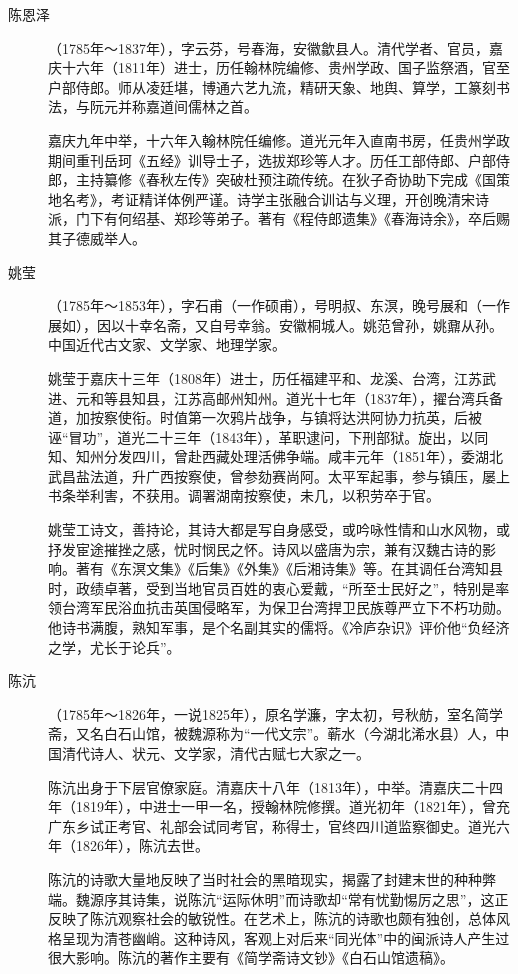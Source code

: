 \begin{description}
  \item[陈恩泽] （1785年～1837年），字云芬，号春海，安徽歙县人。清代学者、官员，嘉庆十六年（1811年）进士，历任翰林院编修、贵州学政、国子监祭酒，官至户部侍郎。师从凌廷堪，博通六艺九流，精研天象、地舆、算学，工篆刻书法，与阮元并称嘉道间儒林之首。\par
        嘉庆九年中举，十六年入翰林院任编修。道光元年入直南书房，任贵州学政期间重刊岳珂《五经》训导士子，选拔郑珍等人才。历任工部侍郎、户部侍郎，主持纂修《春秋左传》突破杜预注疏传统。在狄子奇协助下完成《国策地名考》，考证精详体例严谨。诗学主张融合训诂与义理，开创晚清宋诗派，门下有何绍基、郑珍等弟子。著有《程侍郎遗集》《春海诗余》，卒后赐其子德威举人。
  \item[姚莹] （1785年～1853年），字石甫（一作硕甫），号明叔、东溟，晚号展和（一作展如），因以十幸名斋，又自号幸翁。安徽桐城人。姚范曾孙，姚鼐从孙。中国近代古文家、文学家、地理学家。\par
        姚莹于嘉庆十三年（1808年）进士，历任福建平和、龙溪、台湾，江苏武进、元和等县知县，江苏高邮州知州。道光十七年（1837年），擢台湾兵备道，加按察使衔。时值第一次鸦片战争，与镇将达洪阿协力抗英，后被诬“冒功”，道光二十三年（1843年），革职逮问，下刑部狱。旋出，以同知、知州分发四川，曾赴西藏处理活佛争端。咸丰元年（1851年），委湖北武昌盐法道，升广西按察使，曾参劾赛尚阿。太平军起事，参与镇压，屡上书条举利害，不获用。调署湖南按察使，未几，以积劳卒于官。\par
        姚莹工诗文，善持论，其诗大都是写自身感受，或吟咏性情和山水风物，或抒发宦途摧挫之感，忧时悯民之怀。诗风以盛唐为宗，兼有汉魏古诗的影响。著有《东溟文集》《后集》《外集》《后湘诗集》等。在其调任台湾知县时，政绩卓著，受到当地官员百姓的衷心爱戴，“所至士民好之”，特别是率领台湾军民浴血抗击英国侵略军，为保卫台湾捍卫民族尊严立下不朽功勋。他诗书满腹，熟知军事，是个名副其实的儒将。《冷庐杂识》评价他“负经济之学，尤长于论兵”。
  \item[陈沆] （1785年～1826年，一说1825年），原名学濂，字太初，号秋舫，室名简学斋，又名白石山馆，被魏源称为“一代文宗”。蕲水（今湖北浠水县）人，中国清代诗人、状元、文学家，清代古赋七大家之一。\par
        陈沆出身于下层官僚家庭。清嘉庆十八年（1813年），中举。清嘉庆二十四年（1819年），中进士一甲一名，授翰林院修撰。道光初年（1821年），曾充广东乡试正考官、礼部会试同考官，称得士，官终四川道监察御史。道光六年（1826年），陈沆去世。\par
        陈沆的诗歌大量地反映了当时社会的黑暗现实，揭露了封建末世的种种弊端。魏源序其诗集，说陈沆“运际休明”而诗歌却“常有忧勤惕厉之思”，这正反映了陈沆观察社会的敏锐性。在艺术上，陈沆的诗歌也颇有独创，总体风格呈现为清苍幽峭。这种诗风，客观上对后来“同光体”中的闽派诗人产生过很大影响。陈沆的著作主要有《简学斋诗文钞》《白石山馆遗稿》。

\end{description}
